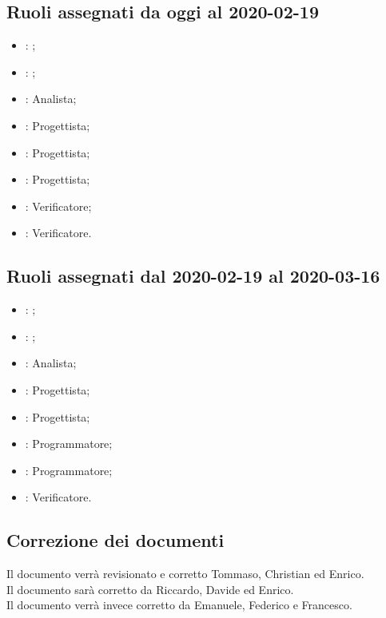 \subsection{Ruoli assegnati da oggi al 2020-02-19}
\begin{itemize}
	\item \MC{}: \Responsabile{};
	\item \CE{}: \Amministratore{};
	\item \AT{}: Analista;
	\item \LD{}: Progettista; 
	\item \DF{}: Progettista;
	\item \SE{}: Progettista;
	\item \PF{}: Verificatore;
	\item \BR{}: Verificatore.
\end{itemize}

\subsection{Ruoli assegnati dal 2020-02-19 al 2020-03-16}
\begin{itemize}
	\item \LD{}: \Responsabile{}; 
	\item \SE{}: \Amministratore{};
	\item \DF{}: Analista;
	\item \CE{}: Progettista;
	\item \MC{}: Progettista;
	\item \BR{}: Programmatore;
	\item \PF{}: Programmatore;
	\item \AT{}: Verificatore.
\end{itemize}

\subsection{Correzione dei documenti}
Il documento \PdP{} verrà revisionato e corretto Tommaso, Christian ed Enrico.\\
Il documento \NdP{} sarà corretto da Riccardo, Davide ed Enrico.\\
Il documento \PdQ{} verrà invece corretto da Emanuele, Federico e Francesco.\\


\clearpage